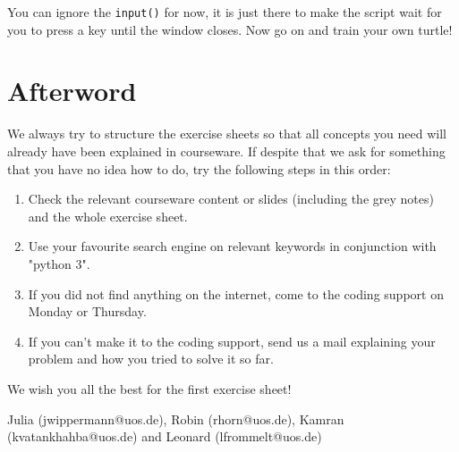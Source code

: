 \noindent You can ignore the \texttt{input()} for now, it is just there to make the script wait for you to press a key until the window closes. Now go on and train your own turtle!

\newpage

\section*{Afterword}

\noindent We always try to structure the exercise sheets so that all concepts you need will already have been explained in courseware. If despite that we ask for something that you have no idea how to do, try the following steps in this order:

\begin{enumerate}

\item Check the relevant courseware content or slides (including the grey notes) and the whole exercise sheet.
\item Use your favourite search engine on relevant keywords in conjunction with "python 3".
\item If you did not find anything on the internet, come to the coding support on Monday or Thursday.
\item If you can't make it to the coding support, send us a mail explaining your problem and how you tried to solve it so far.

\end{enumerate}

\vspace{1em}

\noindent We wish you all the best for the first exercise sheet!

\vspace{1em}

\noindent Julia (jwippermann@uos.de), Robin (rhorn@uos.de), Kamran (kvatankhahba@uos.de) and Leonard (lfrommelt@uos.de)




